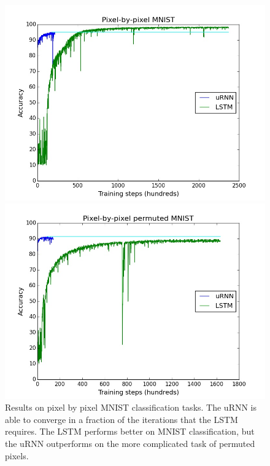 \documentclass{article} %
\begin{document}
\begin{figure}[t!] 
  \label{fig3} 
  \begin{minipage}[b]{0.5\linewidth}
    \centering
    \includegraphics[scale=0.25]{figures/mnist.jpeg}
  \end{minipage}%
  \begin{minipage}[b]{0.5\linewidth}
    \centering
    \includegraphics[scale=0.25]{figures/mnist_perm.jpeg}
  \end{minipage}
  \caption{Results on pixel by pixel MNIST classification tasks. 
           The uRNN is able to converge in a fraction of the iterations
	    that the LSTM requires. The LSTM performs better on MNIST classification, 
	    but the uRNN outperforms on the more complicated task
	    of permuted pixels.}
\end{figure}
\end{document}
